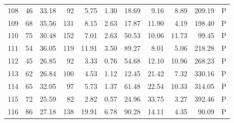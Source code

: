 \begin{table}[ht]
\begin{tabular}{rrrrrrrrrrl}
  108 &  46 & 33.18 &  92 & 5.75 & 1.30 & 18.69 & 9.16 & 8.89 & 209.19 & P \\ 
  109 &  68 & 35.56 & 131 & 8.15 & 2.63 & 17.87 & 11.90 & 4.19 & 198.40 & P \\ 
  110 &  75 & 30.48 & 152 & 7.01 & 2.63 & 50.53 & 10.06 & 11.73 & 99.45 & P \\ 
  111 &  54 & 36.05 & 119 & 11.91 & 3.50 & 89.27 & 8.01 & 5.06 & 218.28 & P \\ 
  112 &  45 & 26.85 &  92 & 3.33 & 0.76 & 54.68 & 12.10 & 10.96 & 268.23 & P \\ 
  113 &  62 & 26.84 & 100 & 4.53 & 1.12 & 12.45 & 21.42 & 7.32 & 330.16 & P \\ 
  114 &  65 & 32.05 &  97 & 5.73 & 1.37 & 61.48 & 22.54 & 10.33 & 314.05 & P \\ 
  115 &  72 & 25.59 &  82 & 2.82 & 0.57 & 24.96 & 33.75 & 3.27 & 392.46 & P \\ 
  116 &  86 & 27.18 & 138 & 19.91 & 6.78 & 90.28 & 14.11 & 4.35 & 90.09 & P \\ 
   \hline
\end{tabular}
\end{table}
